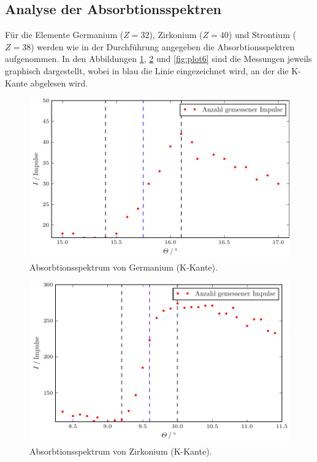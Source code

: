\subsection{Analyse der Absorbtionsspektren}
Für die Elemente Germanium ($Z=32$), Zirkonium ($Z=40$) und Strontium ($Z=38$) werden wie in der Durchführung angegeben die Absorbtionsspektren aufgenommen.
In den Abbildungen \ref{fig:plot4}, \ref{fig:plot5} und \ref{fig:plot6} sind die Messungen jeweils graphisch dargestellt, wobei in blau die Linie eingezeichnet wird, an der die K-Kante abgelesen wird.

\begin{figure}
  \centering
  \includegraphics{build/plot_ge.pdf}
  \caption{Absorbtionsspektrum von Germanium (K-Kante).}
  \label{fig:plot4}
\end{figure}

\begin{figure}
  \centering
  \includegraphics{build/plot_zr.pdf}
  \caption{Absorbtionsspektrum von Zirkonium (K-Kante).}
  \label{fig:plot5}
\end{figure}

